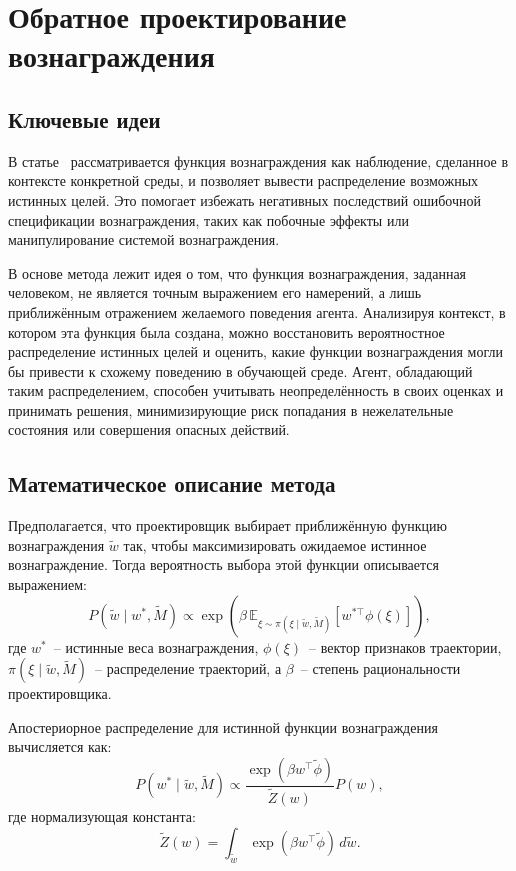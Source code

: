 \section{Обратное проектирование вознаграждения}

\subsection{Ключевые идеи}

В статье~\cite{hadfieldmenell2020inverse} рассматривается функция вознаграждения как наблюдение, сделанное в контексте конкретной среды, и позволяет вывести распределение возможных истинных целей.  
Это помогает избежать негативных последствий ошибочной спецификации вознаграждения, таких как побочные эффекты или манипулирование системой вознаграждения.

В основе метода лежит идея о том, что функция вознаграждения, заданная человеком, не является точным выражением его намерений, а лишь приближённым отражением желаемого поведения агента. Анализируя контекст, в котором эта функция была создана, можно восстановить вероятностное распределение истинных целей и оценить, какие функции вознаграждения могли бы привести к схожему поведению в обучающей среде. Агент, обладающий таким распределением, способен учитывать неопределённость в своих оценках и принимать решения, минимизирующие риск попадания в нежелательные состояния или совершения опасных действий.

\subsection{Математическое описание метода}

Предполагается, что проектировщик выбирает приближённую функцию вознаграждения $\tilde{w}$  так, чтобы максимизировать ожидаемое истинное вознаграждение.  
Тогда вероятность выбора этой функции описывается выражением:
\begin{equation}
P(\tilde{w} \mid w^{*}, \tilde{M}) \propto 
\exp\left(
\beta \, \mathbb{E}_{\xi \sim \pi(\xi \mid \tilde{w}, \tilde{M})}
[w^{*\top} \phi(\xi)]
\right),
\end{equation}
где $w^{*}$~-- истинные веса вознаграждения, $\phi(\xi)$~-- вектор признаков траектории, $\pi(\xi \mid \tilde{w}, \tilde{M})$~-- распределение траекторий, а $\beta$~-- степень рациональности проектировщика.

Апостериорное распределение для истинной функции вознаграждения вычисляется как:
\begin{equation}
P(w^{*} \mid \tilde{w}, \tilde{M}) \propto
\frac{
\exp(\beta w^{\top} \tilde{\phi})
}{
\tilde{Z}(w)
} P(w),
\end{equation}
где нормализующая константа:
\begin{equation}
\tilde{Z}(w) = \int_{\tilde{w}} \exp(\beta w^{\top} \tilde{\phi}) \, d\tilde{w}.
\end{equation}

